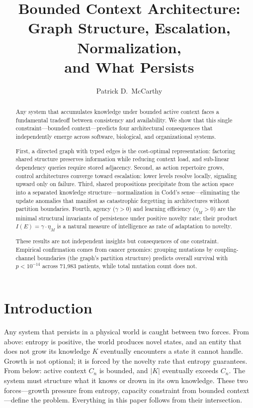 \documentclass[11pt]{article}
\title{Bounded Context Architecture:\\Graph Structure, Escalation, Normalization,\\and What Persists}
\author{Patrick D.\ McCarthy}
\date{}
\theoremstyle{definition}
\theoremstyle{remark}
\begin{document}
\maketitle

\begin{abstract}
Any system that accumulates knowledge under bounded active context
faces a fundamental tradeoff between consistency and availability.
We show that this single constraint---bounded context---predicts
four architectural consequences that independently emerge across
software, biological, and organizational systems.

First, a directed graph with typed edges is the cost-optimal
representation: factoring shared structure preserves information
while reducing context load, and sub-linear dependency queries
require stored adjacency. Second, as action repertoire grows,
control architectures converge toward escalation: lower levels
resolve locally, signaling upward only on failure. Third, shared
propositions precipitate from the action space into a separated
knowledge structure---normalization in Codd's sense---eliminating
the update anomalies that manifest as catastrophic forgetting in
architectures without partition boundaries. Fourth, agency
($\gamma > 0$) and learning efficiency ($\eta_M > 0$) are the
minimal structural invariants of persistence under positive novelty
rate; their product $I(E) = \gamma \cdot \eta_M$ is a natural
measure of intelligence as rate of adaptation to novelty.

These results are not independent insights but consequences of one
constraint. Empirical confirmation comes from cancer genomics:
grouping mutations by coupling-channel boundaries (the graph's
partition structure) predicts overall survival with $p < 10^{-14}$
across 71,983 patients, while total mutation count does not.
\end{abstract}

\section{Introduction}
\label{sec:intro}

Any system that persists in a physical world is caught between two
forces. From above: entropy is positive, the world produces novel
states, and an entity that does not grow its knowledge $K$ eventually
encounters a state it cannot handle. Growth is not optional; it is
forced by the novelty rate that entropy guarantees. From below:
active context $C_n$ is bounded, and $|K|$ eventually exceeds $C_n$.
The system must structure what it knows or drown in its own
knowledge. These two forces---growth pressure from entropy, capacity
constraint from bounded context---define the problem. Everything in
this paper follows from their intersection.
\end{document}
